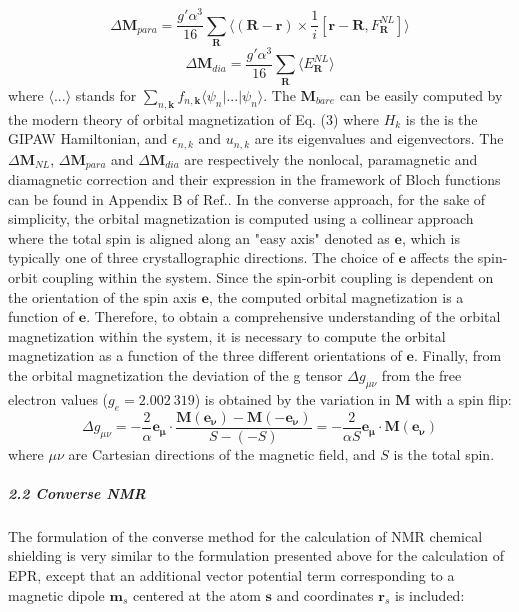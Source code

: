 \documentclass[final,3p,times,twocolumn]{elsarticle}
\begin{document}
\begin{small}
\begin{equation}
\end{equation} 
\begin{equation}
\Delta \mathbf{M}_{para}=\frac{g'\alpha^3}{16}\sum_{\mathbf{R}}^{}\langle{(\mathbf{R-r})}\times\frac{1}{i} \left[\mathbf{r-R}, {F}_\mathbf{R}^{NL}   \right]      \rangle
\end{equation} 
\begin{equation}
\Delta \mathbf{M}_{dia}=\frac{g'\alpha^3}{16}\sum_{\mathbf{R}}^{}\langle{} {E}_\mathbf{R}^{NL}       \rangle
\end{equation} 
where $\langle{}...\rangle$ stands for $\sum\limits_{n,\mathbf{k}} f_{n,\mathbf{k}}\langle \psi_{n}|...|\psi_{n}\rangle$. The $\mathbf{M}_{bare}$ can be easily computed by the modern theory of orbital magnetization of Eq. (3) where $H_{k}$ is the is the GIPAW Hamiltonian, and $\epsilon_{n,k}$ and $u_{n,k}$ are its eigenvalues and eigenvectors. The $\Delta \mathbf{M}_{NL}$, $\Delta \mathbf{M}_{para}$ and $\Delta \mathbf{M}_{dia}$ are respectively the nonlocal, paramagnetic and diamagnetic correction and their expression in the framework of Bloch functions can be found in Appendix B of Ref.\cite{PhysRevB.81.184424}. In the converse approach, for the sake of simplicity, the orbital magnetization is computed using a collinear approach where the total spin is aligned along an "easy axis" denoted as $\mathbf{e}$, which is typically one of three crystallographic directions. The choice of $\mathbf{e}$ affects the spin-orbit coupling within the system. Since the spin-orbit coupling is dependent on the orientation of the spin axis $\mathbf{e}$, the computed orbital magnetization is a function of $\mathbf{e}$. Therefore, to obtain a comprehensive understanding of the orbital magnetization within the system, it is necessary to compute the orbital magnetization as a function of the three different orientations of $\mathbf{e}$.
Finally, from the orbital magnetization the deviation of the g tensor $\Delta g_{\mu\nu}$ from the free electron values ($g_{e}=2.002 \ 319$) is obtained by the variation in  $\mathbf{M}$ with a spin flip: 
\begin{equation}
\Delta g_{\mu\nu}=-\frac{2}{\alpha}\mathbf{e_{\mu}}\cdot \frac{\mathbf{M}(\mathbf{e_{\nu}})-\mathbf{M}(\mathbf{-e_{\nu}})}{S-(-S)}=-\frac{2}{\alpha S} \mathbf{e_{\mu}}\cdot \mathbf{M}(\mathbf{e_{\nu}}) 
\end{equation} 
where $\mu\nu$ are Cartesian directions of the magnetic field, and $S$ is the total spin. 
\subparagraph{2.2 Converse NMR}
\vskip0.5cm
\noindent 
The formulation of the converse method for the calculation of NMR chemical shielding is very similar to the formulation presented above for the calculation of EPR, except that an additional vector potential term corresponding to a magnetic dipole $\mathbf{m}_{s}$ centered at the atom $\mathbf{s}$ and coordinates $\mathbf{r}_{s}$ is included: \\ \\

\end{small}
\end{document}
